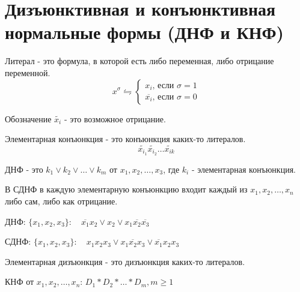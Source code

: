 

\title{}
\author{Козырнов Александр Дмитриевич, ИУ7-32Б}
\date{\today}



\section{Дизъюнктивная и конъюнктивная нормальные формы (ДНФ и КНФ)}

\begin{definition}
Литерал - это формула, в которой есть либо переменная, либо отрицание переменной.
\[
x^{\sigma} \leftrightharpoons \begin{cases}
    x_{i}\text{, если } \sigma = 1\\
    \overline{x_{i}}\text{, если } \sigma = 0
\end{cases}
\]

Обозначение $\widetilde{x_{i}}$ - это возможное отрицание.
\end{definition}

\begin{definition}
Элементарная конъюнкция - это конъюнкция каких-то литералов.
\[
\widetilde{x_{i_1}}\widetilde{x_{i_2}}\ldots \widetilde{x_{ik}}
\] 
\end{definition}

\begin{definition}
ДНФ - это $k_1 \lor k_2 \lor \ldots \lor k_{m}$ от $x_1,x_2,\ldots,x_3$, где 
$k_{i}$ - элементарная конъюнкция.
\end{definition}

\begin{definition}
В СДНФ в каждую элементарную конъюнкцию входит каждый из $x_1,x_2,\ldots,x_{n}$ либо сам,
либо как отрицание.
\end{definition}

\medskip

ДНФ: $\{x_1,x_2,x_3\}:\quad \overline{x_1}x_2 \lor x_2 \lor x_1\overline{x_2}\overline{x_3} $ 

СДНФ: $\{x_1,x_2,x_3\}:\quad x_1x_2x_3 \lor x_1\overline{x_2}x_3 \lor \overline{x_1}x_2x_3$

\begin{definition}
Элементарная дизъюнкция - это дизъюнкция каких-то литералов.
\end{definition}

\begin{definition}
    КНФ от $x_1,x_2,\ldots, x_{n}$: $D_1 * D_2 * \ldots * D_m, m\ge 1$
\end{definition}

